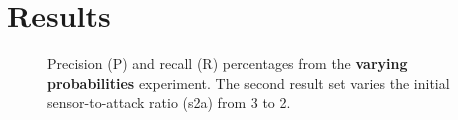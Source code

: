 \section{Results}
\label{sec:results}

\begin{figure}
  
  \caption{Precision (P) and recall (R) percentages from the \textbf{varying
      probabilities} experiment.  The second result set varies
    the initial sensor-to-attack ratio (s2a) from 3 to 2.
  }
  \label{fig:vary-kappa-results}
\end{figure}

